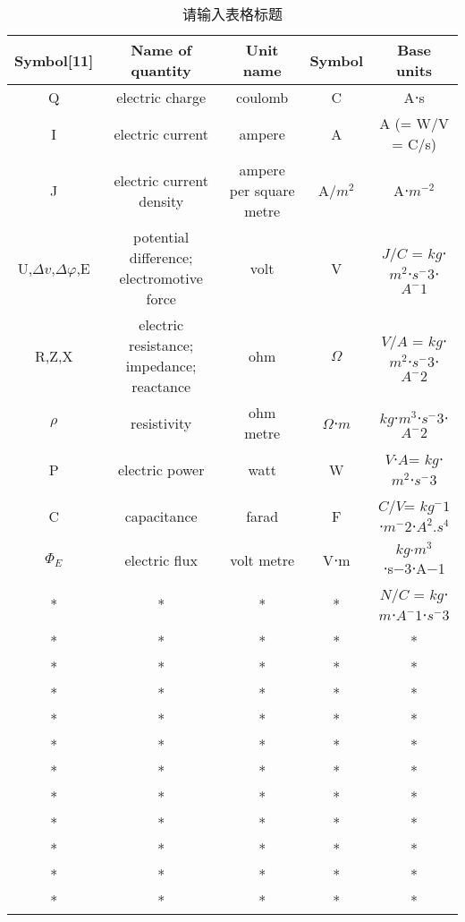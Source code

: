 \begin{table}[ht]
\centering
\caption{请输入表格标题}\label{tab_DCXHZY1}
\begin{tabular}{|c|c|c|c|c|}
\hline
Symbol[11]& Name of quantity & Unit name & Symbol & Base units\\
\hline
Q & electric charge& coulomb & 	C &A⋅s \\
\hline
I & electric current & ampere & A & A (= W/V = C/s)\\
\hline
J & electric current density & ampere per square metre& A/$m^2$ &A⋅$m^{-2}$ \\
\hline
U,$\Delta v$,$\Delta \varphi$,E&potential difference; electromotive force & volt & V &$J/C$ = $kg$⋅$m^2$⋅$s^-3$⋅$A^-1$ \\
\hline
R,Z,X & electric resistance; impedance; reactance & ohm &$\Omega$ &$V/A$ = $kg$⋅$m^2$⋅$s^-3$⋅$A^-2$ \\
\hline
$\rho$ & resistivity & ohm metre & $\Omega $⋅$m$ & $kg$⋅$m^3$⋅$s^-3$⋅$A^-2$\\
\hline
P & electric power& watt &W&$V$⋅$A$= $kg$⋅$m^2$⋅$s^-3$\\
\hline
C & capacitance & farad & F&$ C/V $= $kg^-1$⋅$m^-2$⋅$A^2.s^4 $\\
\hline
$\Phi_E$ & electric flux & volt metre & V⋅m&$kg$$⋅m^3$⋅s−3⋅A−1\\
\hline
* & * & * & * & $N/C$ = $kg$⋅$m$⋅$A^-1$⋅$s^-3$\\
\hline
* & * & * & * & * \\
\hline
* & * & * & * & * \\
\hline
* & * & * & * & * \\
\hline
* & * & * & * & * \\
\hline
* & * & * & * & * \\
\hline
* & * & * & * & * \\
\hline
* & * & * & * & * \\
\hline
* & * & * & * & * \\
\hline
* & * & * & * & * \\
\hline
* & * & * & * & * \\
\hline
* & * & * & * & * \\
\hline
\end{tabular}
\end{table}